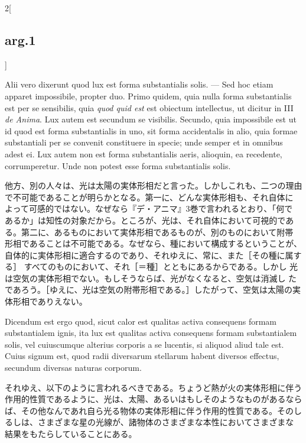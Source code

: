 \documentclass[paper=a4paper,fontsize=10pt,jafontsize=9pt,titlepage]{jlreq}
\begin{document}
\begin{paracol}{2}[\subsection{arg.1}]
\switchcolumn*

Alii vero dixerunt quod lux est forma substantialis solis. --- Sed hoc
etiam apparet impossibile, propter duo. Primo quidem, quia nulla forma
substantialis est per se sensibilis, quia {\itshape quod quid est} est
obiectum intellectus, ut dicitur in III {\itshape de Anima}. Lux autem
est secundum se visibilis. Secundo, quia impossibile est ut id quod est
forma substantialis in uno, sit forma accidentalis in alio, quia formae
substantiali per se convenit constituere in specie; unde semper et in
omnibus adest ei. Lux autem non est forma substantialis aeris, alioquin,
ea recedente, corrumperetur. Unde non potest esse forma substantialis
solis.

\switchcolumn

他方、別の人々は、光は太陽の実体形相だと言った。しかしこれも、二つの理由
 で不可能であることが明らかとなる。第一に、どんな実体形相も、それ自体に
 よって可感的ではない。なぜなら『デ・アニマ』3巻で言われるとおり、「何で
 あるか」は知性の対象だから。ところが、光は、それ自体において可視的であ
 る。第二に、あるものにおいて実体形相であるものが、別のものにおいて附帯
 形相であることは不可能である。なぜなら、種において構成するということが、
 自体的に実体形相に適合するのであり、それゆえに、常に、また［その種に属する］
 すべてのものにおいて、それ［＝種］とともにあるからである。しかし
 光は空気の実体形相でない。もしそうならば、光がなくなると、空気は消滅し
 たであろう。［ゆえに、光は空気の附帯形相である。］したがって、空気は太陽の実体形相でありえない。

\switchcolumn*

Dicendum est ergo quod, sicut calor est qualitas activa
consequens formam substantialem ignis, ita lux est qualitas activa
consequens formam substantialem solis, vel cuiuscumque alterius corporis
a se lucentis, si aliquod aliud tale est. Cuius signum est, quod radii
diversarum stellarum habent diversos effectus, secundum diversas naturas
corporum.

\switchcolumn

それゆえ、以下のように言われるべきである。ちょうど熱が火の実体形相に伴う
作用的性質であるように、光は、太陽、あるいはもしそのようなものがあるなら
ば、その他なんであれ自ら光る物体の実体形相に伴う作用的性質である。そのし
 るしは、さまざまな星の光線が、諸物体のさまざまな本性においてさまざまな
 結果をもたらしていることにある。

\switchcolumn*[\subsection{ad.1}]


\end{paracol}
\end{document}
